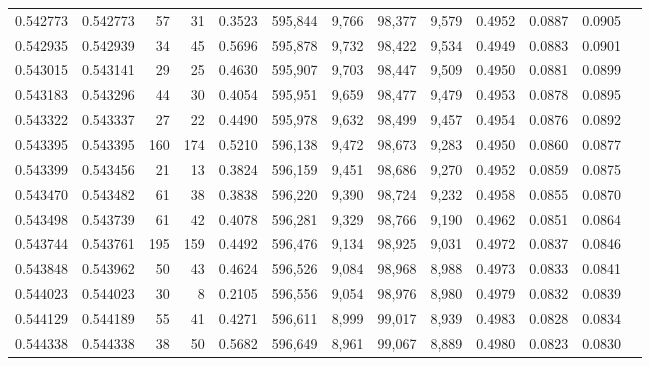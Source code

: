\begin{tabular}{rrrrrrrrrrrrr}
0.542773 & 0.542773 &    57 &    31 &                                     0.3523 & 595,844 &   9,766 &  98,377 &   9,579 & 0.4952 & 0.0887 & 0.0905 \\
0.542935 & 0.542939 &    34 &    45 &                                     0.5696 & 595,878 &   9,732 &  98,422 &   9,534 & 0.4949 & 0.0883 & 0.0901 \\
0.543015 & 0.543141 &    29 &    25 &                                     0.4630 & 595,907 &   9,703 &  98,447 &   9,509 & 0.4950 & 0.0881 & 0.0899 \\
0.543183 & 0.543296 &    44 &    30 &                                     0.4054 & 595,951 &   9,659 &  98,477 &   9,479 & 0.4953 & 0.0878 & 0.0895 \\
0.543322 & 0.543337 &    27 &    22 &                                     0.4490 & 595,978 &   9,632 &  98,499 &   9,457 & 0.4954 & 0.0876 & 0.0892 \\
0.543395 & 0.543395 &   160 &   174 &                                     0.5210 & 596,138 &   9,472 &  98,673 &   9,283 & 0.4950 & 0.0860 & 0.0877 \\
0.543399 & 0.543456 &    21 &    13 &                                     0.3824 & 596,159 &   9,451 &  98,686 &   9,270 & 0.4952 & 0.0859 & 0.0875 \\
0.543470 & 0.543482 &    61 &    38 &                                     0.3838 & 596,220 &   9,390 &  98,724 &   9,232 & 0.4958 & 0.0855 & 0.0870 \\
0.543498 & 0.543739 &    61 &    42 &                                     0.4078 & 596,281 &   9,329 &  98,766 &   9,190 & 0.4962 & 0.0851 & 0.0864 \\
0.543744 & 0.543761 &   195 &   159 &                                     0.4492 & 596,476 &   9,134 &  98,925 &   9,031 & 0.4972 & 0.0837 & 0.0846 \\
0.543848 & 0.543962 &    50 &    43 &                                     0.4624 & 596,526 &   9,084 &  98,968 &   8,988 & 0.4973 & 0.0833 & 0.0841 \\
0.544023 & 0.544023 &    30 &     8 &                                     0.2105 & 596,556 &   9,054 &  98,976 &   8,980 & 0.4979 & 0.0832 & 0.0839 \\
0.544129 & 0.544189 &    55 &    41 &                                     0.4271 & 596,611 &   8,999 &  99,017 &   8,939 & 0.4983 & 0.0828 & 0.0834 \\
0.544338 & 0.544338 &    38 &    50 &                                     0.5682 & 596,649 &   8,961 &  99,067 &   8,889 & 0.4980 & 0.0823 & 0.0830 \\

\end{tabular}
